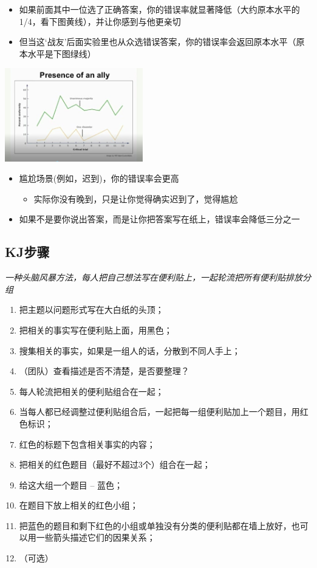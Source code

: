 \begin{itemize}
\tightlist
\item
  如果前面其中一位选了正确答案，你的错误率就显著降低（大约原本水平的1/4，看下图黄线），并让你感到与他更亲切
\item
  但当这`战友'后面实验里也从众选错误答案，你的错误率会返回原本水平（原本水平是下图绿线）
\end{itemize}


\includegraphics[width=6cm]{Asch4Screenshot_2022-07-08_201502.jpg}

\begin{itemize}
\tightlist
\item
  尴尬场景(例如，迟到)，你的错误率会更高

  \begin{itemize}
  \tightlist
  \item
    实际你没有晚到，只是让你觉得确实迟到了，觉得尴尬
  \end{itemize}
\item
  如果不是要你说出答案，而是让你把答案写在纸上，错误率会降低三分之一
\end{itemize}

\hypertarget{kjux6b65ux9aa4}{%
\subsection{KJ步骤}\label{kjux6b65ux9aa4}}

\emph{一种头脑风暴方法，每人把自己想法写在便利贴上，一起轮流把所有便利贴排放分组}

\begin{enumerate}
\tightlist
\item
  把主题以问题形式写在大白纸的头顶；
\item
  把相关的事实写在便利贴上面，用黑色；
\item
  搜集相关的事实，如果是一组人的话，分散到不同人手上；
\item
  （团队）查看描述是否不清楚，是否要整理？
\item
  每人轮流把相关的便利贴组合在一起；
\item
  当每人都已经调整过便利贴组合后，一起把每一组便利贴加上一个题目，用红色标识；
\item
  红色的标题下包含相关事实的内容；
\item
  把相关的红色题目（最好不超过3个）组合在一起；
\item
  给这大组一个题目 -- 蓝色；
\item
  在题目下放上相关的红色小组；
\item
  把蓝色的题目和剩下红色的小组或单独没有分类的便利贴都在墙上放好，也可以用一些箭头描述它们的因果关系；
\item
  （可选）
\end{enumerate}

